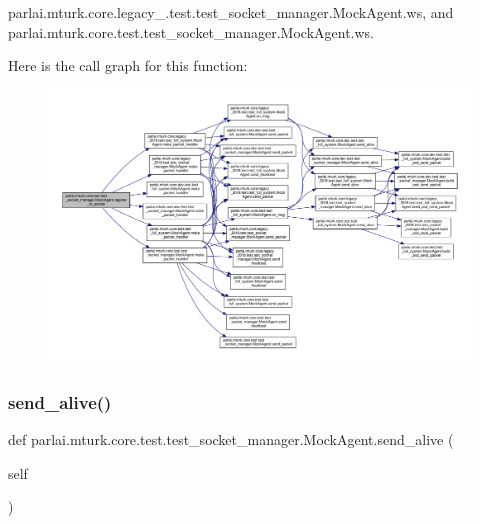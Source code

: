 parlai.\+mturk.\+core.\+legacy\+\_.\+test.\+test\+\_\+socket\+\_\+manager.\+Mock\+Agent.\+ws, and parlai.\+mturk.\+core.\+test.\+test\+\_\+socket\+\_\+manager.\+Mock\+Agent.\+ws.

Here is the call graph for this function\+:
\nopagebreak
\begin{figure}[H]
\begin{center}
\leavevmode
\includegraphics[width=350pt]{classparlai_1_1mturk_1_1core_1_1test_1_1test__socket__manager_1_1MockAgent_acb9b096d3f537b0b28b535b387a86967_cgraph}
\end{center}
\end{figure}
\mbox{\label{classparlai_1_1mturk_1_1core_1_1test_1_1test__socket__manager_1_1MockAgent_adb451acb10da3f0da1537de776ae767a}} 
\subsubsection{\texorpdfstring{send\+\_\+alive()}{send\_alive()}}
{\footnotesize\ttfamily def parlai.\+mturk.\+core.\+test.\+test\+\_\+socket\+\_\+manager.\+Mock\+Agent.\+send\+\_\+alive (\begin{DoxyParamCaption}\item[{}]{self }\end{DoxyParamCaption})}



